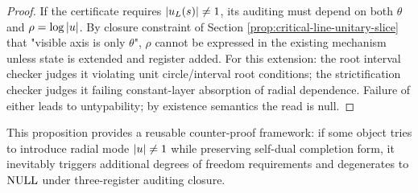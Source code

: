 \begin{proof}
If the certificate requires $\left\lvert u_L(s)\right\rvert\neq 1$, its auditing must depend on both $\theta$ and $\rho=\log\left\lvert u\right\rvert$. By closure constraint of Section \ref{prop:critical-line-unitary-slice} that "visible axis is only $\theta$", $\rho$ cannot be expressed in the existing mechanism unless state is extended and register added. For this extension: the root interval checker judges it violating unit circle/interval root conditions; the strictification checker judges it failing constant-layer absorption of radial dependence. Failure of either leads to untypability; by existence semantics the read is null.\par
\end{proof}

This proposition provides a reusable counter-proof framework: if some object tries to introduce radial mode $\left\lvert u\right\rvert\neq 1$ while preserving self-dual completion form, it inevitably triggers additional degrees of freedom requirements and degenerates to $\mathrm{NULL}$ under three-register auditing closure.\par
